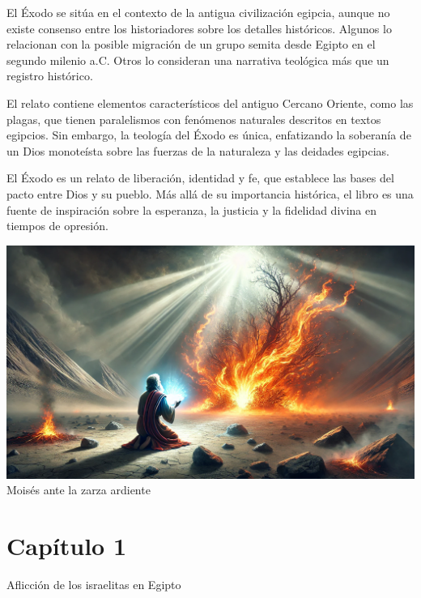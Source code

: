El Éxodo se sitúa en el contexto de la antigua civilización egipcia, aunque no existe consenso entre los historiadores sobre los detalles históricos. Algunos lo relacionan con la posible migración de un grupo semita desde Egipto en el segundo milenio a.C. Otros lo consideran una narrativa teológica más que un registro histórico.

El relato contiene elementos característicos del antiguo Cercano Oriente, como las plagas, que tienen paralelismos con fenómenos naturales descritos en textos egipcios. Sin embargo, la teología del Éxodo es única, enfatizando la soberanía de un Dios monoteísta sobre las fuerzas de la naturaleza y las deidades egipcias.



El Éxodo es un relato de liberación, identidad y fe, que establece las bases del pacto entre Dios y su pueblo. Más allá de su importancia histórica, el libro es una fuente de inspiración sobre la esperanza, la justicia y la fidelidad divina en tiempos de opresión.

	\begin{center}
		\includegraphics[width=0.99\linewidth]{graficas/exodo}\\
	Moisés ante la zarza ardiente 
	\end{center}



\section*{Capítulo 1}
Aflicción de los israelitas en Egipto  




